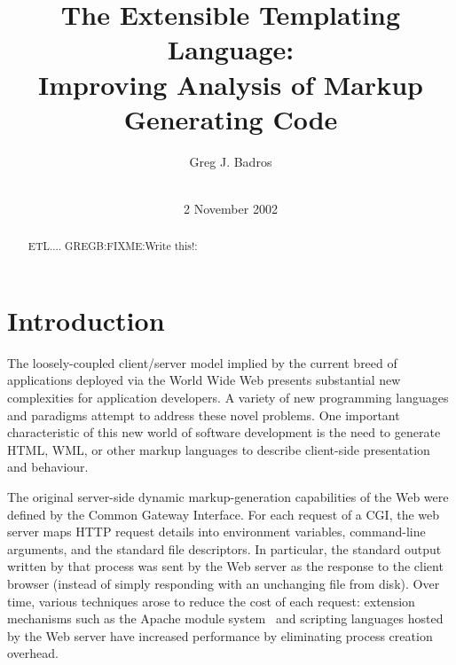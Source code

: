 \documentclass{www2003-submission}
\newcommand{\B}{\discretionary{}{}{}}
\begin{document}
%
\title{The Extensible Templating Language: \\
       Improving Analysis of Markup Generating Code}


\author{
%
\alignauthor Greg J. Badros\\
       \\
}
\date{2 November 2002}
\maketitle
\begin{abstract}
ETL.... GREGB:FIXME:Write this!:
\end{abstract}




\section{Introduction}
\label{sec-intro}

The loosely-coupled client/\B{}server model implied by the current
breed of applications deployed via the World Wide Web presents
substantial new complexities for application developers. A variety of
new programming languages and paradigms attempt to address these novel
problems.  One important characteristic of this new world of software
development is the need to generate HTML, WML, or other markup
languages to describe client-side presentation and behaviour.

The original server-side dynamic markup-generation capabilities of the
Web were defined by the Common Gateway Interface.\cite{CGI} For each
request of a CGI, the web server maps HTTP request details into environment
variables, command-line arguments, and the standard file descriptors.
In particular, the standard output written by that process was sent by
the Web server as the response to the client browser (instead of
simply responding with an unchanging file from disk).  Over time,
various techniques arose to reduce the cost of each request: extension
mechanisms such as the Apache module system~\cite{ApacheModules} and
scripting languages hosted by the Web server have increased
performance by eliminating process creation overhead.
\end{document}
